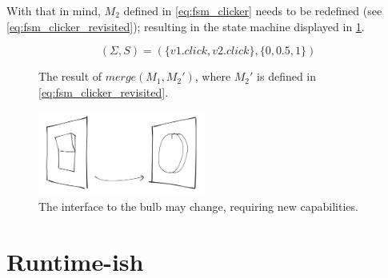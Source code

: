 \documentclass[a4paper]{article}
\begin{document}
With that in mind, $M_2$ defined in \cref{eq:fsm_clicker} needs to be redefined (see \cref{eq:fsm_clicker_revisited});
resulting in the state machine displayed in \cref{fig:bulb_fsm_merge_dfa_upgraded}.

\begin{equation}
    (\Sigma, S) = (\{v1.click, v2.click\}, \{0, 0.5, 1\})
    \label{eq:fsm_clicker_revisited}
\end{equation}


\begin{figure}[ht]
    \centering
    \caption{The result of $merge(M_1, M_{2}')$, where $M_{2}'$ is defined in \cref{eq:fsm_clicker_revisited}.}
    \label{fig:bulb_fsm_merge_dfa_upgraded}
\end{figure}




\begin{figure}[ht]
    \centering
    \includegraphics*[width=5.5cm]{toggle_to_potentiometer}
    \caption{The interface to the bulb may change, requiring new capabilities.}
    \label{fig:to_potentiometer}
\end{figure}



\section*{Runtime-ish}
\end{document}
